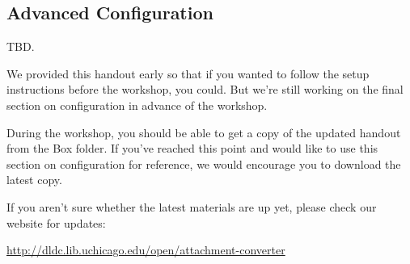 \documentclass[11pt]{article}
\begin{document}
\subsection{Advanced Configuration}
\label{sec:orgcc91458}

TBD.  

We provided this handout early so that if you wanted to follow the
setup instructions before the workshop, you could.  But we're still
working on the final section on configuration in advance of the
workshop.

During the workshop, you should be able to get a copy of the updated
handout from the Box folder.  If you've reached this point and would
like to use this section on configuration for reference, we would
encourage you to download the latest copy.

If you aren't sure whether the latest materials are up yet, please
check our website for updates:

\url{http://dldc.lib.uchicago.edu/open/attachment-converter}
\end{document}
